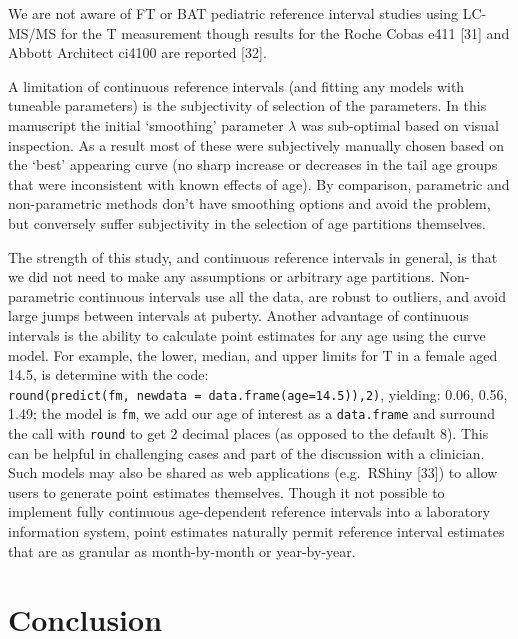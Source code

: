 \documentclass[]{elsarticle} %
\begin{document}
We are not aware of FT or BAT pediatric reference interval studies using
LC-MS/MS for the T measurement though results for the Roche Cobas e411
{[}31{]} and Abbott Architect ci4100 are reported {[}32{]}.

A limitation of continuous reference intervals (and fitting any models
with tuneable parameters) is the subjectivity of selection of the
parameters. In this manuscript the initial `smoothing' parameter
\(\lambda\) was sub-optimal based on visual inspection. As a result most
of these were subjectively manually chosen based on the `best' appearing
curve (no sharp increase or decreases in the tail age groups that were
inconsistent with known effects of age). By comparison, parametric and
non-parametric methods don't have smoothing options and avoid the
problem, but conversely suffer subjectivity in the selection of age
partitions themselves.

The strength of this study, and continuous reference intervals in
general, is that we did not need to make any assumptions or arbitrary
age partitions. Non-parametric continuous intervals use all the data,
are robust to outliers, and avoid large jumps between intervals at
puberty. Another advantage of continuous intervals is the ability to
calculate point estimates for any age using the curve model. For
example, the lower, median, and upper limits for T in a female aged
14.5, is determine with the code:
\texttt{round(predict(fm,\ newdata\ =\ data.frame(age=14.5)),2)},
yielding: 0.06, 0.56, 1.49; the model is \texttt{fm}, we add our age of
interest as a \texttt{data.frame} and surround the call with
\texttt{round} to get 2 decimal places (as opposed to the default 8).
This can be helpful in challenging cases and part of the discussion with
a clinician. Such models may also be shared as web applications
(e.g.~RShiny {[}33{]}) to allow users to generate point estimates
themselves. Though it not possible to implement fully continuous
age-dependent reference intervals into a laboratory information system,
point estimates naturally permit reference interval estimates that are
as granular as month-by-month or year-by-year.

\hypertarget{conclusion}{%
\section{Conclusion}\label{conclusion}}
\end{document}
